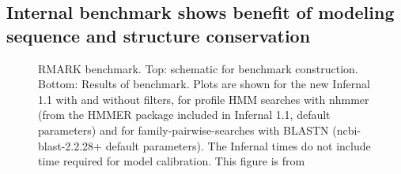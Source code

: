\documentclass[custom,landscape,final,30pt,plainboxedsections]{sciposter-titleskipsmall}
\begin{document}
\begin{multicols}{3}
\columnbreak

\section*{Internal benchmark shows benefit of modeling sequence and
  structure conservation}


\begin{footnotesize}
\begin{figure}
\caption{
RMARK benchmark. Top: schematic for benchmark
construction. Bottom: Results of benchmark. Plots are shown for the new
Infernal 1.1 with and without filters, for
profile HMM searches with nhmmer \cite{Wheeler13b} (from the HMMER package included in
Infernal 1.1, default parameters) and for family-pairwise-searches
with BLASTN (ncbi-blast-2.2.28+ default parameters). The Infernal
times do not include time required for model calibration. This figure
is from \cite{Nawrocki13c}}
\label{fig:rmark}
\end{figure}
\end{footnotesize}


\end{multicols}
\end{document}
